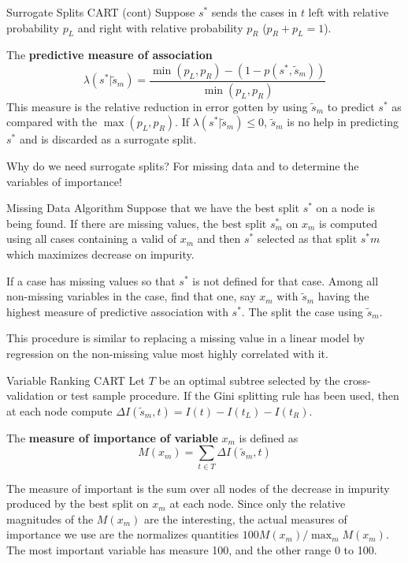 \documentclass{beamer}
\begin{document}
\begin{frame}{Surrogate Splits CART (cont)}
	Suppose $s^*$ sends the cases in $t$ left with relative probability $p_L$ and right with relative probability $p_R$ ($p_R+p_L=1$).
	
	The \textbf{predictive measure of association} 
	\begin{equation*}
		\lambda(s^*| \tilde{s}_m)= \frac{\min(p_L,p_R)-(1-p(s^*,\tilde{s}_m))}{\min(p_L,p_R)}
	\end{equation*}
	This measure is the relative reduction in error gotten by using $\tilde{s}_m$ to predict $s^*$ as compared with the $\max (p_L,p_R)$. If $\lambda(s^*| \tilde{s}_m)\le 0$, $\tilde{s}_m$ is no help in predicting $s^*$ and is discarded as a surrogate split. 
	
	Why do we need surrogate splits? For missing data and to determine the variables of importance!
	

\end{frame}

\begin{frame}{Missing Data Algorithm}
	Suppose that we have the best split $s^*$ on a node is being found. If there are missing values, the best split $s^*_m$ on $x_m$ is computed using all cases containing a valid of $x_m$ and then $s^*$ selected as that split $s^*m$ which maximizes decrease on impurity.
	
	If a case has missing values so that $s^*$ is not defined for that case. Among all non-missing variables in the case, find that one, say $x_m$ with $\tilde{s}_m$ having the highest measure of predictive association with $s^*$. The split the case using $\tilde{s}_m$.
	
	This procedure is similar to replacing a missing value in a linear model by regression on the non-missing value most highly correlated with it. 
	
\end{frame}

\begin{frame}{Variable Ranking CART}
	Let $T$ be an optimal subtree selected by the cross-validation or test sample procedure. If the Gini splitting rule has been used, then at each node compute $\Delta I(\tilde{s}_m,t)= I(t)-I(t_L)-I(t_R)$.
	
	The \textbf{measure of importance of variable} $x_m$ is defined as
	\begin{equation*}
		M(x_m)= \sum_{t\in T} \Delta I (\tilde{s}_m, t)
	\end{equation*}

	The measure of important is the sum over all nodes of the decrease in impurity produced by the best split on $x_m$ at each node. Since only the relative magnitudes of the $M(x_m)$ are the interesting, the actual measures of importance we use are the normalizes quantities $100 M(x_m)/\max_m M(x_m)$. The most important variable has measure 100, and the other range 0 to 100.
\end{frame}
\end{document}
